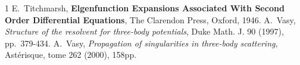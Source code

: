\documentclass[11pt]{article}
\theoremstyle{definition}
\theoremstyle{remark}
\begin{document}
\begin{thebibliography}{1}
{\sc E.~Titchmarsh}, {\bf Elgenfunction Expansions Associated With Second Order
  Differential Equations}, The Clarendon Press, Oxford, 1946.
  {\sc A.~Vasy}, {\em Structure of the resolvent for three-body
  potentials}, Duke Math. J. 90 (1997), pp.~379-434.
    {\sc A.~Vasy}, {\em Propagation of singularities in three-body
  scattering}, Ast\'erisque, tome 262 (2000), 158pp.
\end{thebibliography}


\end{document}
